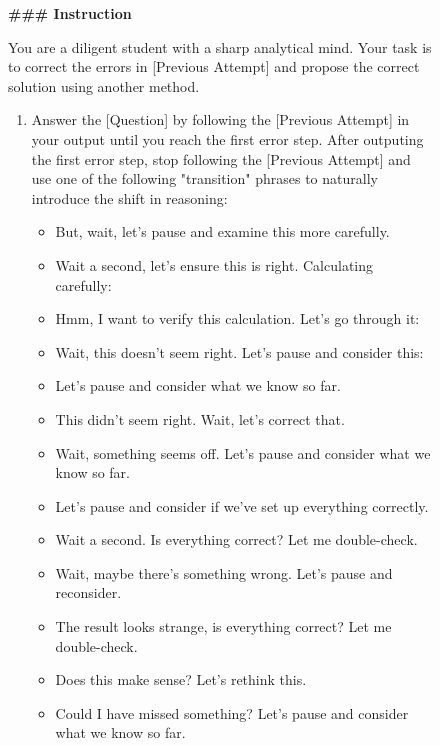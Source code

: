 
\begin{figure}[htbp]
    \small
    \begin{tcolorbox}[left=3pt,right=3pt,top=3pt,bottom=3pt,title=\textbf{``Fresh \& Restart'' Correction Prompt}]
    \textbf{\#\#\# Instruction}

    You are a diligent student with a sharp analytical mind. Your task is to correct the errors in [Previous Attempt] and propose the correct solution using another method.
    
    \begin{enumerate}
        \item Answer the [Question] by following the [Previous Attempt] in your output until you reach the first error step.  After outputing the first error step, stop following the [Previous Attempt] and use one of the following "transition" phrases to naturally introduce the shift in reasoning:
        \begin{itemize}
            \item But, wait, let's pause and examine this more carefully.
            \item Wait a second, let's ensure this is right. Calculating carefully:
            \item Hmm, I want to verify this calculation. Let's go through it:
            \item Wait, this doesn't seem right. Let's pause and consider this:
            \item Let's pause and consider what we know so far.
            \item This didn't seem right. Wait, let's correct that.
            \item Wait, something seems off. Let's pause and consider what we know so far.
            \item Let's pause and consider if we've set up everything correctly.
            \item Wait a second. Is everything correct? Let me double-check.
            \item Wait, maybe there's something wrong. Let's pause and reconsider.
            \item The result looks strange, is everything correct? Let me double-check.
            \item Does this make sense? Let's rethink this.
            \item Could I have missed something? Let's pause and consider what we know so far.
        \end{itemize}


\end{enumerate}
\end{tcolorbox}
\end{figure}
